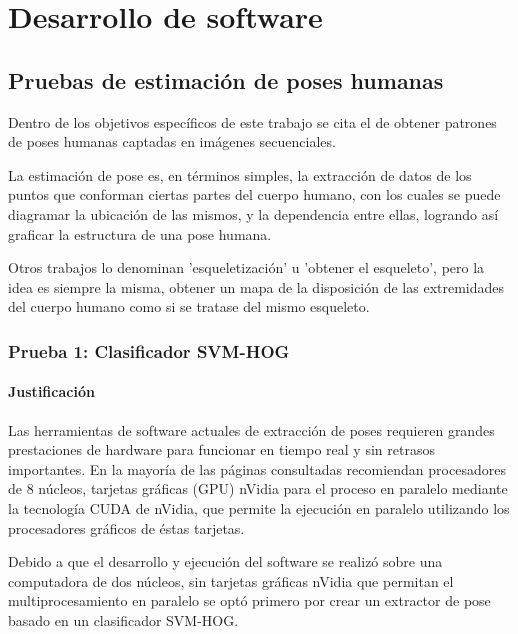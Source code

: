 \documentclass[a4paper,12pt,oneside,spanish]{book}
\begin{document}
\newpage
\chapter{Desarrollo de software}
\section{Pruebas de estimación de poses humanas}\label{pruebaspose}

Dentro de los objetivos específicos de este trabajo se cita el de obtener patrones de poses humanas captadas en imágenes secuenciales.\par

La estimación de pose es, en términos simples, la extracción de datos  de los puntos que conforman ciertas partes del cuerpo humano, con los cuales se puede diagramar la ubicación de las mismos, y la dependencia entre ellas, logrando así graficar la estructura de una pose humana.\par

Otros trabajos lo denominan 'esqueletización' u 'obtener el esqueleto', pero la idea es siempre la misma, obtener un mapa de la disposición de las extremidades del cuerpo humano como si se tratase del mismo esqueleto.\par

\subsection{Prueba 1: Clasificador SVM-HOG}

\subsubsection{Justificación}
Las herramientas de software actuales de extracción de poses requieren grandes prestaciones de hardware para funcionar en tiempo real y sin retrasos importantes. En la mayoría de las páginas consultadas recomiendan procesadores de 8 núcleos, tarjetas gráficas (GPU) nVidia para el proceso en paralelo mediante la tecnología CUDA de nVidia, que permite la ejecución en paralelo utilizando los procesadores gráficos de éstas tarjetas.\par

Debido a que el desarrollo y ejecución del software se realizó sobre una computadora de dos núcleos, sin tarjetas gráficas nVidia que permitan el multiprocesamiento en paralelo se optó primero por crear un extractor de pose basado en un clasificador SVM-HOG.\par
\end{document}
